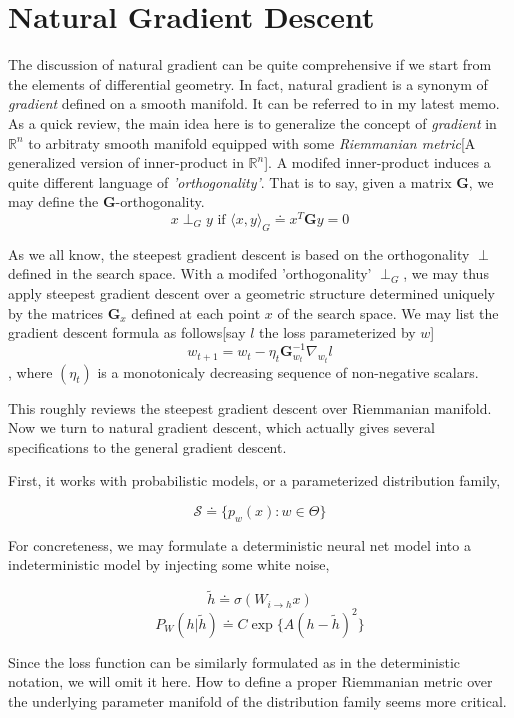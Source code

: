 \documentclass[10pt,a4paper]{article}
\begin{document}
\section{Natural Gradient Descent\cite{Amari1998}\cite{Pascanu2013}}
The discussion of natural gradient can be quite comprehensive if we start from the elements of differential geometry. In fact, natural gradient is a synonym of \textit{gradient} defined on a smooth manifold. It can be referred to in my latest memo\cite{memo}. As a quick review, the main idea here is to generalize the concept of \textit{gradient} in $\mathbb{R}^n$ to arbitraty smooth manifold equipped with some \textit{Riemmanian metric}[A generalized version of inner-product in $\mathbb{R}^n$]. A modifed inner-product induces a quite different language of \textit{'orthogonality'}. That is to say, given a matrix $\mathbf{G}$, we may define the \textbf{G}-orthogonality.
$$
x\perp_{G}{y} \text{ if } \langle{x},y\rangle_{G}\doteq{x}^T\mathbf{G}y=0
$$

As we all know, the steepest gradient descent is based on the orthogonality $\perp$ defined in the search space. With a modifed 'orthogonality' $\perp_{G}$, we may thus apply steepest gradient descent over a geometric structure determined uniquely by the matrices $\mathbf{G}_x$ defined at each point $x$ of the search space. We may list the gradient descent formula as follows[say $\mathit{l}$ the loss parameterized by $w$]
$$
	w_{t+1} = w_{t}-\eta_{t}\mathbf{G}_{w_t}^{-1}\nabla_{w_t}\mathit{l}
$$
, where $(\eta_{t})$ is a monotonicaly decreasing sequence of non-negative scalars.

This roughly reviews the steepest gradient descent over Riemmanian manifold. Now we turn to natural gradient descent, which actually gives several specifications to the general gradient descent.

First, it works with probabilistic models, or a parameterized  distribution family,

$$
	 \mathcal{S} \doteq{\{p_{w}(x):w\in\Theta\}}
$$  

For concreteness, we may formulate a deterministic neural net model into a indeterministic model by injecting some white noise,

$$
\tilde{h} \doteq \sigma(W_{i\to{h}}x)
$$
$$
P_{W}(h|\tilde{h}) \doteq C\exp\{A(h-\tilde{h})^2\}
$$

Since the loss function can be similarly formulated as in the deterministic notation, we will omit it here. How to define a proper Riemmanian metric over the underlying parameter manifold of the distribution family seems more critical.
\end{document}
